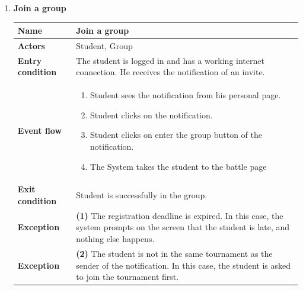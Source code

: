 \documentclass{article}
\begin{document}
\begin{enumerate}[label=\textbf{UC\arabic*}:]
        
        \item \textbf{Join a group}
            \begin{center}
        \begin{tabular}{ | m{8em} | m{10cm}|  } 
            \hline 
            \textbf{Name} & Join a group\\[1ex] 
            \hline 
            \textbf{Actors} & Student, Group\\[1ex] 
            \hline 
            \textbf{Entry condition} & The student is logged in and has a working internet connection. He receives the notification of an invite. \\[1ex] 
            \hline 
            \textbf{Event flow} & \begin{enumerate}[label=\textbf{\arabic*}:]
                \item Student sees the notification from his personal page.
                \item Student clicks on the notification.
                \item Student clicks on enter the group button of the notification.
                \item The System takes the student to the battle page 
            \end{enumerate} \\[1ex]
            \hline 
            \textbf{Exit condition} & Student is successfully in the group.\\[1ex]
            \hline
            \textbf{Exception} & \textbf{(1)} The registration deadline is expired. In this case, the system prompts on the screen that the student is late, and nothing else happens.\\[1ex]
            \hline
            \textbf{Exception} & \textbf{(2)} The student is not in the same tournament as the sender of the notification. In this case, the student is asked to join the tournament first.\\[1ex]
            \hline 
        \end{tabular}
    \end{center}



\end{enumerate}
\end{document}
